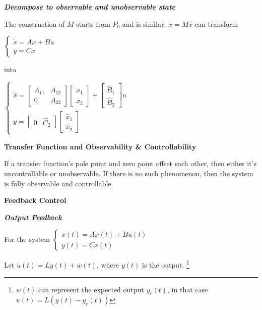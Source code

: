 \documentclass{article}
\newcommand{\bigtitle}[1]{
	\noindent
	\textbf{#1}
}
\newcommand{\smalltitle}[1]{
	\noindent
	\textbf{\textit{#1}}
}
\begin{document}
\begin{spacing}{1.2}
\smalltitle{Decompose to observable and unobservable state}

The construction of $M$ starts from $P_0$ and is similar. $x=M \hat{x}$ can transform

$\left\{\begin{array}{c}{\dot{x}=A x+B u} \\ {y=C x}\end{array}\right.$ 

into 


$\left\{\begin{array}{cc}{\dot{\hat{x}}=\left[ \begin{array}{cc}{A_{11}} & {A_{12}} \\ {0} & {A_{22}}\end{array}\right] \left[ \begin{array}{c}{\hat{x}_{1}} \\ {\hat{x}_{2}}\end{array}\right]+\left[ \begin{array}{c}{\hat{B}_{1}} \\ {\hat{B}_{2}}\end{array}\right] u} \\ {y=\left[ \begin{array}{cc}{0} & {\hat{C}_{2}}\end{array}\right] \left[ \begin{array}{c}{\hat{x}_{1}} \\ {\hat{x}_{2}}\end{array}\right]}\end{array}\right.$

\bigtitle{Transfer Function and Observability \& Controllability}

If a transfer function's pole point and zero point offset each other, then either it's uncontrollable or unobservable. If there is no such phenomenon, then the system is fully observable and controllable.


\bigtitle{Feedback Control}

\smalltitle{Output Feedback}

For the system 
$\left\lbrace \begin{array}{l}{x(t)=A x(t)+B u(t)} \\ {y(t)=C x(t)}\end{array} \right.$

Let $u(t)=L y(t)+w(t)$, where $y(t)$ is the output.
\footnote{$w(t)$ can represent the expected output $y_r(t)$, in that case $u(t)=L\left(y(t)-y_{r}(t)\right)$}


\end{spacing}
\end{document}

